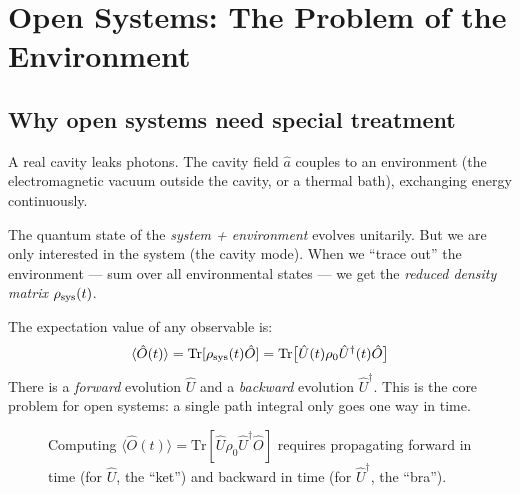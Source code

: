 \documentclass[12pt]{article}
\newcommand{\av}[1]{\langle #1 \rangle}
\begin{document}
\section{Open Systems: The Problem of the Environment}

\subsection{Why open systems need special treatment}

A real cavity leaks photons. The cavity field $\hat{a}$ couples to
an environment (the electromagnetic vacuum outside the cavity, or a
thermal bath), exchanging energy continuously.

The quantum state of the \emph{system + environment} evolves
unitarily. But we are only interested in the system (the cavity
mode). When we ``trace out'' the environment --- sum over all
environmental states --- we get the \emph{reduced density matrix}
$\rho_{\rm sys}(t)$.

The expectation value of any observable is:
\begin{equation}
  \av{\hat{O}(t)} = \mathrm{Tr}[\rho_{\rm sys}(t)\hat{O}]
  = \mathrm{Tr}\bigl[\hat{U}(t)\rho_0\hat{U}^\dagger(t)\hat{O}\bigr]
  \label{eq:open_expect}
\end{equation}
There is a \emph{forward} evolution $\hat{U}$ and a \emph{backward}
evolution $\hat{U}^\dagger$. This is the core problem for open systems:
a single path integral only goes one way in time.

\begin{figure}[h]
\centering
{}
\caption{Computing $\av{\hat{O}(t)} = \mathrm{Tr}[\hat{U}\rho_0\hat{U}^\dagger\hat{O}]$
requires propagating forward in time (for $\hat{U}$, the ``ket'')
and backward in time (for $\hat{U}^\dagger$, the ``bra'').}
\end{figure}
\end{document}
